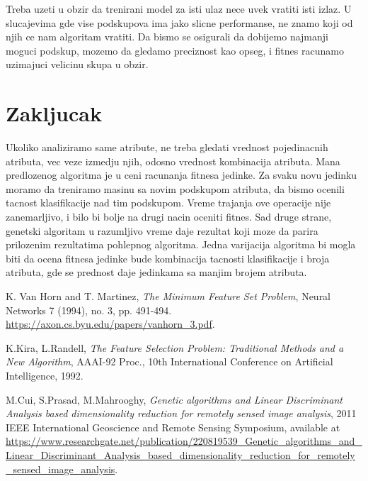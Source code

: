 \documentclass[11pt]{article} %
\begin{document}
Treba uzeti u obzir da trenirani model za isti ulaz nece uvek vratiti isti izlaz. U slucajevima gde vise podskupova ima jako slicne performanse, ne znamo koji od njih ce nam algoritam vratiti. Da bismo se osigurali da dobijemo najmanji moguci podskup, mozemo da gledamo preciznost kao opseg, i fitnes racunamo uzimajuci velicinu skupa u obzir.
	
\newpage
\section{Zakljucak}
Ukoliko analiziramo same atribute, ne treba gledati vrednost pojedinacnih atributa, vec veze izmedju njih, odosno vrednost kombinacija atributa. \newline
Mana predlozenog algoritma je u ceni racunanja fitnesa jedinke. Za svaku novu jedinku moramo da treniramo masinu sa novim podskupom atributa, da bismo ocenili tacnost klasifikacije nad tim podskupom. Vreme trajanja ove operacije nije zanemarljivo, i bilo bi bolje na drugi nacin oceniti fitnes. \newline
Sad druge strane, genetski algoritam u razumljivo vreme daje rezultat koji moze da parira prilozenim rezultatima pohlepnog algoritma. Jedna varijacija algoritma bi mogla biti da ocena fitnesa jedinke bude kombinacija tacnosti klasifikacije i broja atributa, gde se prednost daje jedinkama sa manjim brojem atributa.
\newpage

\newpage
\begin{thebibliography}{9}

 K. Van Horn and T. Martinez, \emph{The Minimum Feature Set Problem},  Neural Networks 7 (1994), no. 3, pp. 491-494.
\url{https://axon.cs.byu.edu/papers/vanhorn_3.pdf}.

 K.Kira, L.Randell, \emph{The Feature Selection Problem: Traditional Methods and a New Algorithm}, AAAI-92 Proc., 10th International Conference on Artificial Intelligence, 1992.

 M.Cui, S.Prasad, M.Mahrooghy, \emph{Genetic algorithms and Linear Discriminant Analysis based dimensionality reduction for remotely sensed image analysis},  2011 IEEE International Geoscience and Remote Sensing Symposium, available at 
\url{https://www.researchgate.net/publication/220819539_Genetic_algorithms_and_Linear_Discriminant_Analysis_based_dimensionality_reduction_for_remotely_sensed_image_analysis}.

\end{thebibliography}
\end{document}
